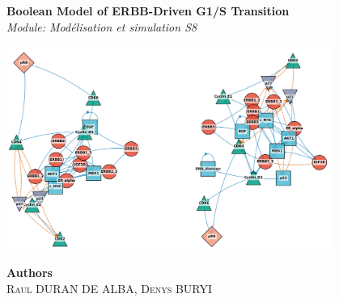 \documentclass[a4paper,12pt]{article}
\begin{document}
\begin{titlepage}
    \begin{center}
        \vspace*{-1cm}
        \vspace{2cm}
        
        {\Large \textbf{Boolean Model of ERBB-Driven G1/S Transition}} \\[1cm] 
        
        \textit{Module: Modélisation et simulation S8} \\[1.5cm]
        
        \vspace{2cm}
        
        \includegraphics[width=0.8\textwidth]{images/front_page_diagram.png} \\[1.5cm]
        
        \vfill %

        \textbf{Authors} \\[0.5cm]
        \textsc{Raul DURAN DE ALBA, Denys BURYI}

    \end{center}
\end{titlepage}
\end{document}
